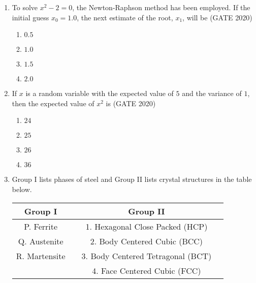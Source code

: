 \documentclass[journal,12pt,onecolumn]{IEEEtran}
\theoremstyle{remark}
\begin{document}
\begin{enumerate}
\item To solve $x^2 - 2 = 0$, the Newton-Raphson method has been employed. If the initial guess $x_0 = 1.0$, the next estimate of the root, $x_1$, will be  
\hfill{(GATE 2020)}
\begin{multicols}{4}
\begin{enumerate}
    \item $0.5$
    \item $1.0$
    \item $1.5$
    \item $2.0$
\end{enumerate}
\end{multicols}
\vspace{1cm}
\item If $x$ is a random variable with the expected value of $5$ and the variance of $1$, then the expected value of $x^2$ is
\hfill{(GATE 2020)}
\begin{multicols}{4}
\begin{enumerate}
    \item $24$
    \item $25$
    \item $26$
    \item $36$
\end{enumerate}
\end{multicols}
\vspace{1cm}

\item Group I lists phases of steel and Group II lists crystal structures in the table below.

\begin{center}
\begin{tabular}{|c|l|c|l|}
\hline
\textbf{Group I} & & \textbf{Group II} & \\
\hline
P. Ferrite & & 1. Hexagonal Close Packed (HCP) & \\
Q. Austenite & & 2. Body Centered Cubic (BCC) & \\
R. Martensite & & 3. Body Centered Tetragonal (BCT) & \\
             & & 4. Face Centered Cubic (FCC) & \\
\hline
\end{tabular}
\end{center}


\end{enumerate}
\end{document}

